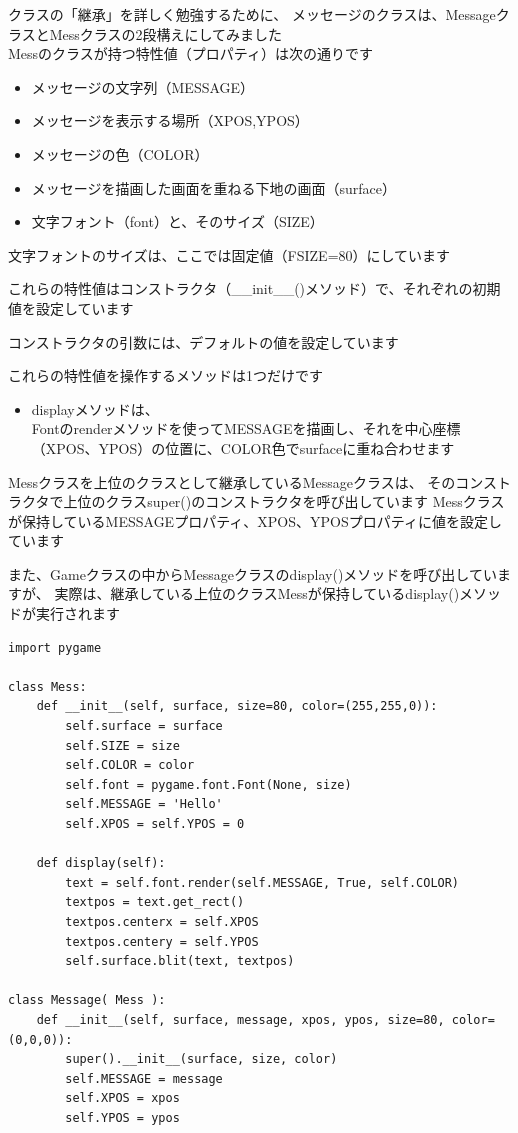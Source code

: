\documentclass[uplatex,a4paper,11pt,oneside,openany]{jsbook}
\begin{document}
クラスの「継承」を詳しく勉強するために、
メッセージのクラスは、MessageクラスとMessクラスの2段構えにしてみました\\

Messのクラスが持つ特性値（プロパティ）は次の通りです

\begin{itemize}
  \item メッセージの文字列（MESSAGE）
  \item メッセージを表示する場所（XPOS,YPOS）
  \item メッセージの色（COLOR）
  \item メッセージを描画した画面を重ねる下地の画面（surface）
  \item 文字フォント（font）と、そのサイズ（SIZE）
\end{itemize}

文字フォントのサイズは、ここでは固定値（FSIZE=80）にしています

これらの特性値はコンストラクタ（\_\_init\_\_()メソッド）で、それぞれの初期値を設定しています

コンストラクタの引数には、デフォルトの値を設定しています

これらの特性値を操作するメソッドは1つだけです

\begin{itemize}
  \item displayメソッドは、\\Fontのrenderメソッドを使ってMESSAGEを描画し、それを中心座標（XPOS、YPOS）の位置に、COLOR色でsurfaceに重ね合わせます
\end{itemize}

Messクラスを上位のクラスとして継承しているMessageクラスは、
そのコンストラクタで上位のクラスsuper()のコンストラクタを呼び出しています
Messクラスが保持しているMESSAGEプロパティ、XPOS、YPOSプロパティに値を設定しています

また、Gameクラスの中からMessageクラスのdisplay()メソッドを呼び出していますが、
実際は、継承している上位のクラスMessが保持しているdisplay()メソッドが実行されます

\begin{lstlisting}[caption=Messageクラス,label=p4]
import pygame

class Mess:
    def __init__(self, surface, size=80, color=(255,255,0)):
        self.surface = surface
        self.SIZE = size
        self.COLOR = color
        self.font = pygame.font.Font(None, size)
        self.MESSAGE = 'Hello'
        self.XPOS = self.YPOS = 0

    def display(self):
        text = self.font.render(self.MESSAGE, True, self.COLOR)
        textpos = text.get_rect()
        textpos.centerx = self.XPOS
        textpos.centery = self.YPOS
        self.surface.blit(text, textpos)

class Message( Mess ):
    def __init__(self, surface, message, xpos, ypos, size=80, color=(0,0,0)):
        super().__init__(surface, size, color)
        self.MESSAGE = message
        self.XPOS = xpos
        self.YPOS = ypos
\end{lstlisting}
\end{document}
